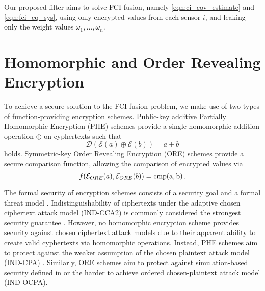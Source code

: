 \documentclass[letterpaper, 10 pt, conference]{ieeeconf}  %
\begin{document}
Our proposed filter aims to solve FCI fusion, namely \eqref{eqn:ci_cov_estimate} and \eqref{eqn:fci_eq_sys}, using only encrypted values from each sensor $i$, and leaking only the weight values $\omega_1,\dots,\omega_n$.




\section{Homomorphic and Order Revealing Encryption} \label{sec:encryption}
To achieve a secure solution to the FCI fusion problem, we make use of two types of function-providing encryption schemes. Public-key additive Partially Homomorphic Encryption (PHE) schemes \cite{paillierPublicKeyCryptosystemsBased1999,goldwasserProbabilisticEncryption1984} provide a single homomorphic addition operation $\oplus$ on cyphertexts such that
\begin{equation}
   \mathcal{D}(\mathcal{E}(a) \oplus \mathcal{E}(b)) = a+b \label{eqn:phe_eq}
\end{equation}
holds. Symmetric-key Order Revealing Encryption (ORE) schemes \cite{chenettePracticalOrderRevealingEncryption2016,lewiOrderRevealingEncryptionNew2016} provide a secure comparison function, allowing the comparison of encrypted values via
\begin{equation}
   f(\mathcal{E}_{ORE}(a), \mathcal{E}_{ORE}(b)) = \operatorfont{cmp}(a, b)\,. \label{eqn:ore_eq}
\end{equation}

The formal security of encryption schemes consists of a security goal and a formal threat model \cite{katzIntroductionModernCryptography2008}. Indistinguishability of ciphertexts under the adaptive chosen ciphertext attack model (IND-CCA2) is commonly considered the strongest security guarantee \cite{bellareRelationsNotionsSecurity1998}. However, no homomorphic encryption scheme provides security against chosen ciphertext attack models due to their apparent ability to create valid cyphertexts via homomorphic operations. Instead, PHE schemes aim to protect against the weaker assumption of the chosen plaintext attack model (IND-CPA) \cite{chaseSecurityHomomorphicEncryption2017}. Similarly, ORE schemes aim to protect against simulation-based security defined in \cite{chenettePracticalOrderRevealingEncryption2016} or the harder to achieve ordered chosen-plaintext attack model (IND-OCPA).
\end{document}
